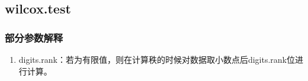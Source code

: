 \subsection{wilcox.test}
\subsubsection{部分参数解释}
\begin{enumerate}
	\item digits.rank：若为有限值，则在计算秩的时候对数据取小数点后digits.rank位进行计算。
\end{enumerate}
